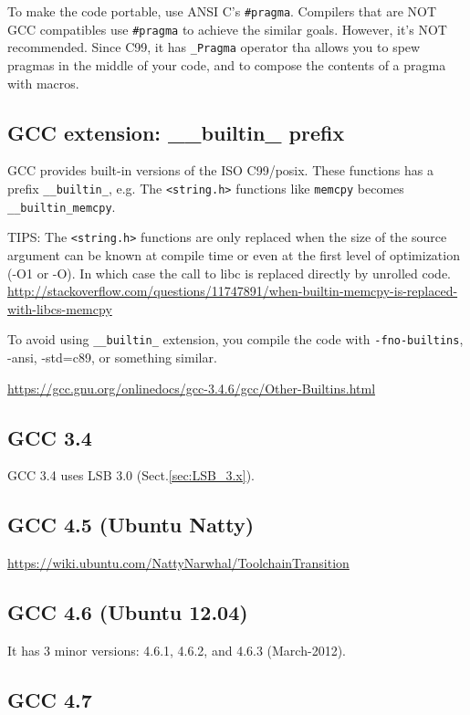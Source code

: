 To make the code portable, use ANSI C's \verb!#pragma!.  Compilers that are NOT
GCC compatibles use \verb!#pragma! to achieve the similar goals. However, it's
NOT recommended. Since C99, it has \verb!_Pragma! operator tha allows you to
spew pragmas in the middle of your code, and to compose the contents of a pragma
with macros.

\subsection{GCC extension: \_\_builtin\_ prefix}
\label{sec:__builtin_C99functions}

GCC provides built-in versions of the ISO C99/posix. These functions has a
prefix \verb!__builtin_!, e.g. The \verb!<string.h>! functions
like \verb!memcpy! becomes \verb!__builtin_memcpy!.

TIPS: The \verb!<string.h>! functions are only replaced when the size of the
source argument can be known at compile time or even at the first level of
optimization (-O1 or -O). In which case the call to libc is replaced directly by
unrolled code.
\url{http://stackoverflow.com/questions/11747891/when-builtin-memcpy-is-replaced-with-libcs-memcpy}

To avoid using \verb!__builtin_! extension, you compile the code with
\verb!-fno-builtins!, -ansi, -std=c89, or something similar.


\url{https://gcc.gnu.org/onlinedocs/gcc-3.4.6/gcc/Other-Builtins.html}


\subsection{GCC 3.4}

GCC 3.4 uses LSB 3.0 (Sect.\ref{sec:LSB_3.x}).

\subsection{GCC 4.5 (Ubuntu Natty)}

\url{https://wiki.ubuntu.com/NattyNarwhal/ToolchainTransition}

\subsection{GCC 4.6 (Ubuntu 12.04)}

It has 3 minor versions: 4.6.1, 4.6.2, and 4.6.3 (March-2012). 

\subsection{GCC 4.7}

